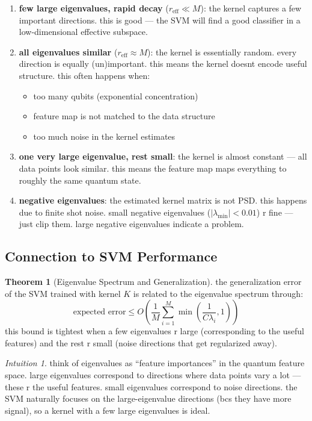 \documentclass[11pt,a4paper]{article}
\theoremstyle{definition}
\newtheorem{theorem}{Theorem}[section]
\theoremstyle{remark}
\newtheorem*{intuition}{Intuition}
\begin{document}
\begin{enumerate}[leftmargin=*]
    \item \textbf{few large eigenvalues, rapid decay} ($r_{\text{eff}} \ll M$): the kernel captures a few important directions. this is good --- the SVM will find a good classifier in a low-dimensional effective subspace.

    \item \textbf{all eigenvalues similar} ($r_{\text{eff}} \approx M$): the kernel is essentially random. every direction is equally (un)important. this means the kernel doesnt encode useful structure. this often happens when:
    \begin{itemize}[leftmargin=*]
        \item too many qubits (exponential concentration)
        \item feature map is not matched to the data structure
        \item too much noise in the kernel estimates
    \end{itemize}

    \item \textbf{one very large eigenvalue, rest small}: the kernel is almost constant --- all data points look similar. this means the feature map maps everything to roughly the same quantum state.

    \item \textbf{negative eigenvalues}: the estimated kernel matrix is not PSD. this happens due to finite shot noise. small negative eigenvalues ($|\lambda_{\min}| < 0.01$) r fine --- just clip them. large negative eigenvalues indicate a problem.
\end{enumerate}

\subsection{Connection to SVM Performance}

\begin{theorem}[Eigenvalue Spectrum and Generalization]
the generalization error of the SVM trained with kernel $K$ is related to the eigenvalue spectrum through:
\[
\text{expected error} \leq O\!\left(\frac{1}{M} \sum_{i=1}^M \min\!\left(\frac{1}{C \lambda_i}, 1\right)\right)
\]
this bound is tightest when a few eigenvalues r large (corresponding to the useful features) and the rest r small (noise directions that get regularized away).
\end{theorem}

\begin{intuition}
think of eigenvalues as ``feature importances'' in the quantum feature space. large eigenvalues correspond to directions where data points vary a lot --- these r the useful features. small eigenvalues correspond to noise directions. the SVM naturally focuses on the large-eigenvalue directions (bcs they have more signal), so a kernel with a few large eigenvalues is ideal.
\end{intuition}
\end{document}
